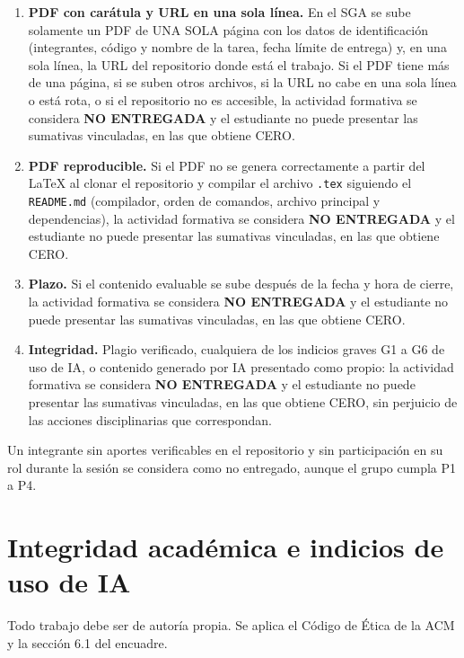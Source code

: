 \documentclass[11pt]{article}
\newcommand{\seccion}[1]{\section{\textcolor{utegreendk}{#1}}}
\begin{document}
\begin{cajapiso}[title={Criterios de piso: su incumplimiento equivale a no entregar (CERO en la sumativa vinculada)}]
	\begin{enumerate}[label=\textbf{P\arabic*.},leftmargin=24pt,itemsep=3pt]
		\item \textbf{PDF con carátula y URL en una sola línea.} En el SGA se sube solamente un PDF de UNA SOLA página con los datos de identificación (integrantes, código y nombre de la tarea, fecha límite de entrega) y, en una sola línea, la URL del repositorio donde está el trabajo. Si el PDF tiene más de una página, si se suben otros archivos, si la URL no cabe en una sola línea o está rota, o si el repositorio no es accesible, la actividad formativa se considera \textbf{NO ENTREGADA} y el estudiante no puede presentar las sumativas vinculadas, en las que obtiene CERO.
		\item \textbf{PDF reproducible.} Si el PDF no se genera correctamente a partir del \LaTeX{} al clonar el repositorio y compilar el archivo \texttt{.tex} siguiendo el \texttt{README.md} (compilador, orden de comandos, archivo principal y dependencias), la actividad formativa se considera \textbf{NO ENTREGADA} y el estudiante no puede presentar las sumativas vinculadas, en las que obtiene CERO.
		\item \textbf{Plazo.} Si el contenido evaluable se sube después de la fecha y hora de cierre, la actividad formativa se considera \textbf{NO ENTREGADA} y el estudiante no puede presentar las sumativas vinculadas, en las que obtiene CERO.
		\item \textbf{Integridad.} Plagio verificado, cualquiera de los indicios graves G1 a G6 de uso de IA, o contenido generado por IA presentado como propio: la actividad formativa se considera \textbf{NO ENTREGADA} y el estudiante no puede presentar las sumativas vinculadas, en las que obtiene CERO, sin perjuicio de las acciones disciplinarias que correspondan.
	\end{enumerate}
	Un integrante sin aportes verificables en el repositorio y sin participación en su rol durante la sesión se considera como no entregado, aunque el grupo cumpla P1 a P4.
\end{cajapiso}

\seccion{Integridad académica e indicios de uso de IA}

Todo trabajo debe ser de autoría propia. Se aplica el Código de Ética de la ACM \citep{acm_code_2018} y la sección 6.1 del encuadre.
\end{document}
